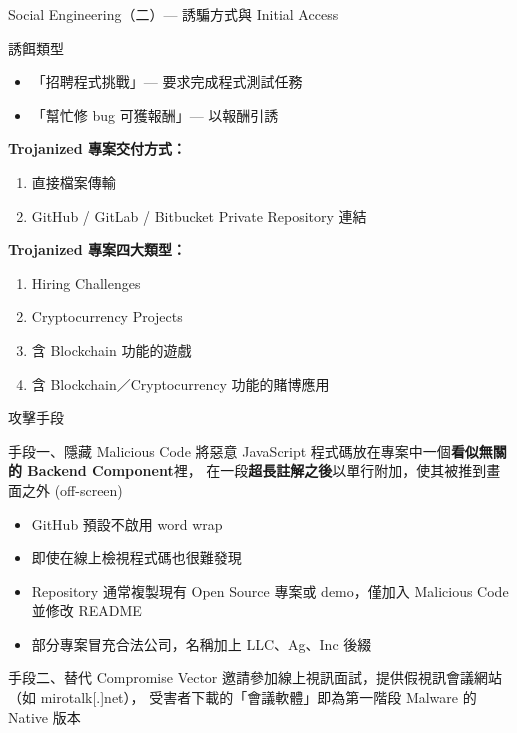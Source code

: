 \documentclass{beamer}
\begin{document}
\begin{frame}{Social Engineering（二）— 誘騙方式與 Initial Access}
  \begin{block}{誘餌類型}
    \begin{itemize}
      \item 「招聘程式挑戰」— 要求完成程式測試任務
      \item 「幫忙修 bug 可獲報酬」— 以報酬引誘
    \end{itemize}
  \end{block}

  \textbf{Trojanized 專案交付方式：}
  \begin{enumerate}
    \item 直接檔案傳輸
    \item GitHub / GitLab / Bitbucket Private Repository 連結
  \end{enumerate}
  \textbf{Trojanized 專案四大類型：}
  \begin{enumerate}
    \item Hiring Challenges
    \item Cryptocurrency Projects
    \item 含 Blockchain 功能的遊戲
    \item 含 Blockchain／Cryptocurrency 功能的賭博應用
  \end{enumerate}
\end{frame}

\begin{frame}{攻擊手段}
  \begin{block}{手段一、隱藏 Malicious Code}
    將惡意 JavaScript 程式碼放在專案中一個\textbf{看似無關的 Backend Component}裡，
    在一段\textbf{超長註解之後}以單行附加，使其被推到畫面之外 (off-screen)
  \end{block}

  \begin{itemize}
    \item GitHub 預設不啟用 word wrap
    \item 即使在線上檢視程式碼也很難發現
    \item Repository 通常複製現有 Open Source 專案或 demo，僅加入 Malicious Code 並修改 README
    \item 部分專案冒充合法公司，名稱加上 LLC、Ag、Inc 後綴
  \end{itemize}

  \vspace{0.3cm}
  \begin{block}{手段二、替代 Compromise Vector}
    邀請參加線上視訊面試，提供假視訊會議網站（如 mirotalk[.]net），
    受害者下載的「會議軟體」即為第一階段 Malware 的 Native 版本
  \end{block}
\end{frame}
\end{document}
